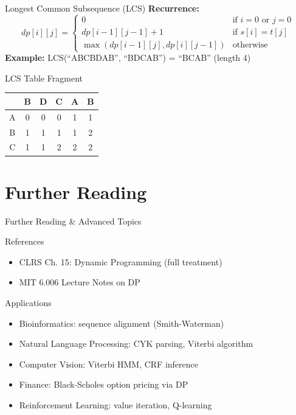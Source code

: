 \documentclass[aspectratio=169,xcolor=dvipsnames]{beamer}
\begin{document}
\begin{frame}[fragile]{Longest Common Subsequence (LCS)}
  \textbf{Recurrence:}
  $$dp[i][j] = \begin{cases}
    0 & \text{if } i=0 \text{ or } j=0 \\
    dp[i-1][j-1]+1 & \text{if } s[i] = t[j] \\
    \max(dp[i-1][j], dp[i][j-1]) & \text{otherwise}
  \end{cases}$$
  \textbf{Example:} LCS(``ABCBDAB'', ``BDCAB'') = ``BCAB'' (length 4)\\[6pt]
  \begin{block}{LCS Table Fragment}
    \begin{tabular}{c|ccccc}
      & B & D & C & A & B \\ \hline
      A & 0 & 0 & 0 & 1 & 1 \\
      B & 1 & 1 & 1 & 1 & 2 \\
      C & 1 & 1 & 2 & 2 & 2 \\
    \end{tabular}
  \end{block}
\end{frame}

\section{Further Reading}
\begin{frame}{Further Reading \& Advanced Topics}
  \begin{block}{References}
    \begin{itemize}
      \item CLRS Ch. 15: Dynamic Programming (full treatment)
      \item MIT 6.006 Lecture Notes on DP
    \end{itemize}
  \end{block}
  \begin{exampleblock}{Applications}
    \begin{itemize}
      \item Bioinformatics: sequence alignment (Smith-Waterman)
      \item Natural Language Processing: CYK parsing, Viterbi algorithm
      \item Computer Vision: Viterbi HMM, CRF inference
      \item Finance: Black-Scholes option pricing via DP
      \item Reinforcement Learning: value iteration, Q-learning
    \end{itemize}
  \end{exampleblock}
\end{frame}
\end{document}
